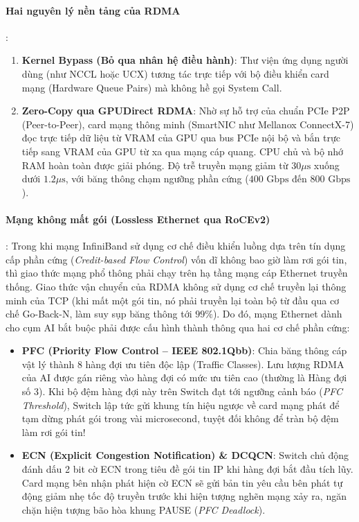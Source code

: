 \paragraph{Hai nguyên lý nền tảng của RDMA}:
\begin{enumerate}
  \item \textbf{Kernel Bypass (Bỏ qua nhân hệ điều hành)}: Thư viện ứng dụng người dùng (như NCCL hoặc UCX) tương tác trực tiếp với bộ điều khiển card mạng (Hardware Queue Pairs) mà không hề gọi System Call.
  \item \textbf{Zero-Copy qua GPUDirect RDMA}: Nhờ sự hỗ trợ của chuẩn PCIe P2P (Peer-to-Peer), card mạng thông minh (SmartNIC như Mellanox ConnectX-7) đọc trực tiếp dữ liệu từ VRAM của GPU qua bus PCIe nội bộ và bắn trực tiếp sang VRAM của GPU từ xa qua mạng cáp quang. CPU chủ và bộ nhớ RAM hoàn toàn được giải phóng.
  Độ trễ truyền mạng giảm từ $30\mu\text{s}$ xuống dưới \textbf{$1.2\mu\text{s}$}, với băng thông chạm ngưỡng phần cứng ($400\text{ Gbps}$ đến $800\text{ Gbps}$).
\end{enumerate}

\paragraph{Mạng không mất gói (Lossless Ethernet qua RoCEv2)}:
Trong khi mạng InfiniBand sử dụng cơ chế điều khiển luồng dựa trên tín dụng cấp phần cứng (\textit{Credit-based Flow Control}) vốn dĩ không bao giờ làm rơi gói tin, thì giao thức mạng phổ thông  phải chạy trên hạ tầng mạng cáp Ethernet truyền thống.
Giao thức vận chuyển của RDMA không sử dụng cơ chế truyền lại thông minh của TCP (khi mất một gói tin, nó phải truyền lại toàn bộ từ đầu qua cơ chế Go-Back-N, làm suy sụp băng thông tới $99\%$). Do đó, mạng Ethernet dành cho cụm AI bắt buộc phải được cấu hình thành  thông qua hai cơ chế phần cứng:
\begin{itemize}
  \item \textbf{PFC (Priority Flow Control -- IEEE 802.1Qbb)}: Chia băng thông cáp vật lý thành 8 hàng đợi ưu tiên độc lập (Traffic Classes). Lưu lượng RDMA của AI được gán riêng vào hàng đợi có mức ưu tiên cao (thường là Hàng đợi số 3). Khi bộ đệm hàng đợi này trên Switch đạt tới ngưỡng cảnh báo (\textit{PFC Threshold}), Switch lập tức gửi khung tín hiệu  ngược về card mạng phát để tạm dừng phát gói trong vài microsecond, tuyệt đối không để tràn bộ đệm làm rơi gói tin!
  \item \textbf{ECN (Explicit Congestion Notification) \& DCQCN}: Switch chủ động đánh dấu 2 bit cờ ECN trong tiêu đề gói tin IP khi hàng đợi bắt đầu tích lũy. Card mạng bên nhận phát hiện cờ ECN sẽ gửi bản tin  yêu cầu bên phát tự động giảm nhẹ tốc độ truyền trước khi hiện tượng nghẽn mạng xảy ra, ngăn chặn hiện tượng bão hòa khung PAUSE (\textit{PFC Deadlock}).
\end{itemize}

